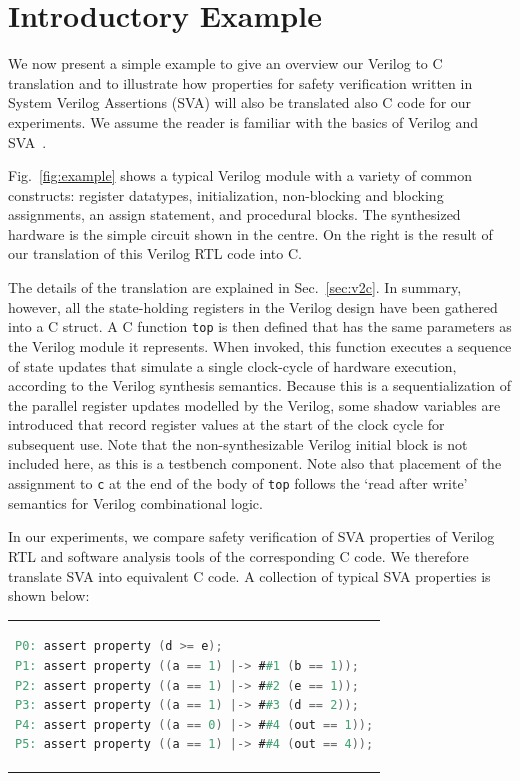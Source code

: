 \section{Introductory Example} 

We now present a simple example to give an overview our Verilog to C translation and to illustrate how properties for safety verification written in System Verilog Assertions (SVA) will also be translated also C code for our experiments. We assume the reader is familiar with the basics of Verilog and SVA~\cite{verilog}. 

Fig.~\ref{fig:example} shows a typical Verilog module with a variety of common constructs: register datatypes, initialization, non-blocking and blocking assignments, an assign statement, and procedural blocks.  The synthesized hardware is the simple circuit shown in the centre.  On the right is the result of our translation of this Verilog RTL code into C.

The details of the translation are explained in Sec.~\ref{sec:v2c}. In summary, however, all the state-holding registers in the Verilog design have been gathered into a C struct. A C function \texttt{top} is then defined that has the same parameters as the Verilog module it represents. When invoked, this function executes a sequence of state updates that simulate a single clock-cycle of hardware execution, according to the Verilog synthesis semantics. Because this is a sequentialization of the parallel register updates modelled by the Verilog, some shadow variables are introduced that record register values at the start of the clock cycle for subsequent use. Note that the non-synthesizable Verilog initial block is not included here, as this is a testbench component. Note also that placement of the assignment to \texttt{c} at the end of the body of \texttt{top} follows the `read after write' semantics for Verilog combinational logic.

In our experiments, we compare safety verification of SVA properties of Verilog RTL and software analysis tools of the corresponding C code. We therefore translate SVA into equivalent C code. A collection of typical SVA properties is shown below:

\begin{center}
\begin{tabular}[t]{@{}l@{}}
\begin{lstlisting}[mathescape=true,language=Verilog,basicstyle=\scriptsize\ttfamily]
P0: assert property (d >= e);
P1: assert property ((a == 1) |-> ##1 (b == 1));
P2: assert property ((a == 1) |-> ##2 (e == 1));
P3: assert property ((a == 1) |-> ##3 (d == 2));
P4: assert property ((a == 0) |-> ##4 (out == 1));
P5: assert property ((a == 1) |-> ##4 (out == 4));
\end{lstlisting}
\end{tabular}
\end{center}

